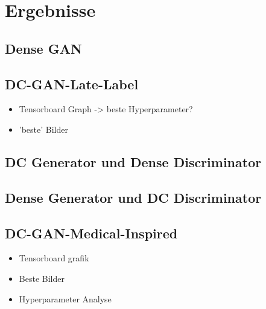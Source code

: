 
\chapter{Ergebnisse}

\section{Dense GAN}

\section{DC-GAN-Late-Label}
\begin{itemize}
	\item Tensorboard Graph -> beste Hyperparameter?
	\item 'beste' Bilder
\end{itemize}

\section{DC Generator und Dense Discriminator}

\section{Dense Generator und DC Discriminator}

\section{DC-GAN-Medical-Inspired}
\begin{itemize}
	\item Tensorboard grafik
	\item Beste Bilder
	\item Hyperparameter Analyse
\end{itemize}
